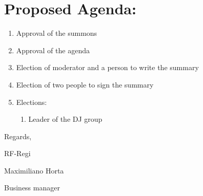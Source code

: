 \documentclass[a4paper]{article}
\begin{document}
\section*{\textsf{Proposed Agenda:}}
\begin{enumerate}
    \item Approval of the summons
    \item Approval of the agenda
    \item Election of moderator and a person to write the summary
    \item Election of two people to sign the summary
    \item Elections:
    \begin{enumerate}
        \item Leader of the DJ group
    \end{enumerate}
\end{enumerate}

\vspace{2cm}
Regards,

RF-Regi

Maximiliano Horta

Business manager
\end{document}
